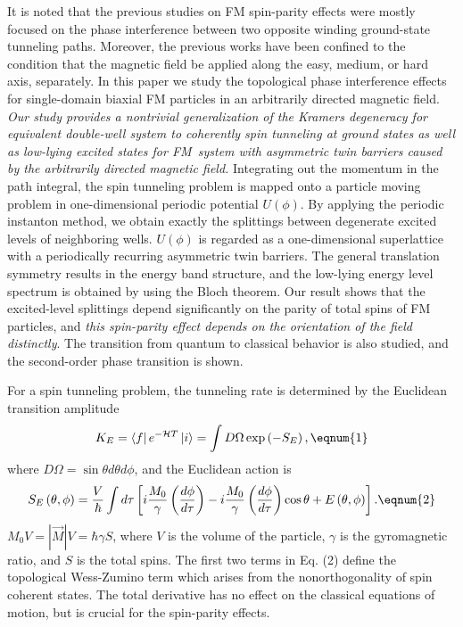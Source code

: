 It is noted that the previous studies on FM spin-parity effects\cite
{4,7,8,9,14} were mostly focused on the phase interference between two
opposite winding ground-state tunneling paths. Moreover, the previous works%
\cite{4,7,8,9} have been confined to the condition that the magnetic field
be applied along the easy, medium, or hard axis, separately. In this paper
we study the topological phase interference effects for single-domain
biaxial FM particles in an arbitrarily directed magnetic field. {\it Our
study provides a nontrivial generalization of the Kramers degeneracy for
equivalent double-well system to coherently spin tunneling at ground states
as well as low-lying excited states for FM\ system with asymmetric twin
barriers caused by the arbitrarily directed magnetic field.} Integrating out
the momentum in the path integral, the spin tunneling problem is mapped onto
a particle moving problem in one-dimensional periodic potential $U\left(
\phi \right) $. By applying the periodic instanton method, we obtain exactly
the splittings between degenerate excited levels of neighboring wells. $%
U\left( \phi \right) $ is regarded as a one-dimensional superlattice with a
periodically recurring asymmetric twin barriers. The general translation
symmetry results in the energy band structure, and the low-lying energy
level spectrum is obtained by using the Bloch theorem. Our result shows that
the excited-level splittings depend significantly on the parity of total
spins of FM particles, and {\it this spin-parity effect depends on the
orientation of the field distinctly}. The transition from quantum to
classical behavior is also studied, and the second-order phase transition is
shown.

For a spin tunneling problem, the tunneling rate is determined by the
Euclidean transition amplitude 
\begin{equation}
K_E=\left\langle f\right| e^{-{\cal H}T}\left| i\right\rangle =\int D\Omega
\exp \left( -S_E\right) ,  \eqnum{1}
\end{equation}
where $D\Omega =\sin \theta d\theta d\phi $, and the Euclidean action is 
\begin{equation}
S_E\left( \theta ,\phi \right) =\frac V\hbar \int d\tau \left[ i\frac{M_0}%
\gamma \left( \frac{d\phi }{d\tau }\right) -i\frac{M_0}\gamma \left( \frac{%
d\phi }{d\tau }\right) \cos \theta +E\left( \theta ,\phi \right) \right] . 
\eqnum{2}
\end{equation}
$M_0V=\left| \overrightarrow{M}\right| V=\hbar \gamma S$, where $V$ is the
volume of the particle, $\gamma $ is the gyromagnetic ratio, and $S$ is the
total spins. The first two terms in Eq. (2) define the topological
Wess-Zumino term which arises from the nonorthogonality of spin coherent
states.\cite{3} The total derivative has no effect on the classical
equations of motion, but is crucial for the spin-parity effects.

